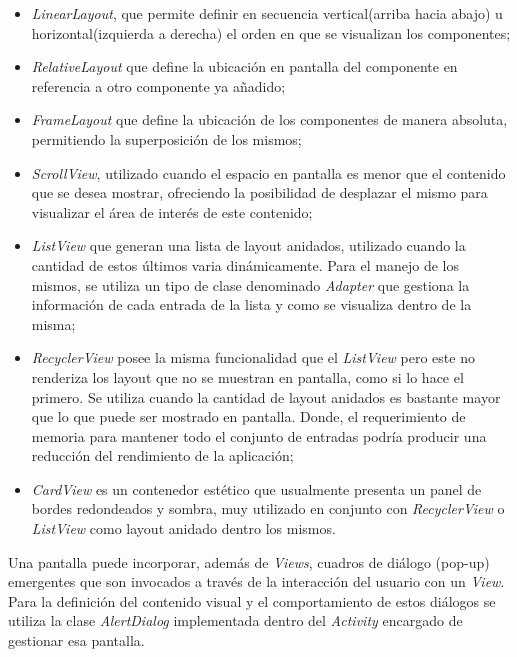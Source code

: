     \begin{itemize}
        \item \textit{LinearLayout}, que permite definir en secuencia vertical(arriba hacia abajo)  u horizontal(izquierda a derecha) el orden en que se visualizan los componentes;
        \item \textit{RelativeLayout} que define la ubicación en pantalla del componente en referencia a otro componente ya añadido;
        
        \item \textit{FrameLayout} que define la ubicación de los componentes de manera absoluta, permitiendo la superposición de los mismos;
        
        \item \textit{ScrollView}, utilizado cuando el espacio en pantalla es menor que el contenido que se desea mostrar, ofreciendo la posibilidad de desplazar el mismo para visualizar el área de interés de este contenido;
        
        \item \textit{ListView} que generan una lista de layout anidados, utilizado cuando la cantidad de estos últimos varia dinámicamente. Para el manejo de los mismos, se utiliza un tipo de clase denominado \textit{Adapter} que gestiona la información de cada entrada de la lista y como se visualiza dentro de la misma;
        
        \item \textit{RecyclerView} posee la misma funcionalidad que el \textit{ListView} pero este no renderiza los layout que no se muestran en pantalla, como si lo hace el primero. Se utiliza cuando la cantidad de layout anidados es bastante mayor que lo que puede ser mostrado en pantalla. Donde, el requerimiento de memoria para mantener todo el conjunto de entradas podría producir una reducción del rendimiento de la aplicación;
        
        \item \textit{CardView} es un contenedor estético que usualmente presenta un panel de bordes redondeados y sombra, muy utilizado en conjunto con \textit{RecyclerView} o \textit{ListView} como layout anidado dentro los mismos.
        
    \end{itemize}

    
    \par Una pantalla puede incorporar, además de \textit{Views}, cuadros de diálogo (pop-up) emergentes que son invocados a través de la interacción del usuario con un \textit{View}. Para la definición del contenido visual y el comportamiento de estos diálogos se utiliza la clase \textit{AlertDialog} implementada dentro del \textit{Activity} encargado de gestionar esa pantalla.
    
